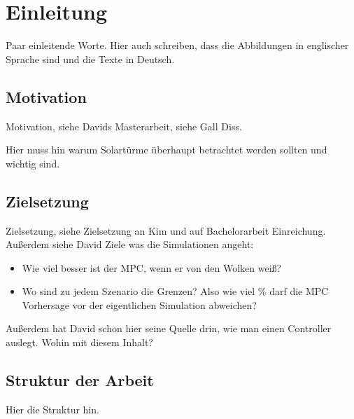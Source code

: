 \chapter{Einleitung} \label{ch_Einleitung}
Paar einleitende Worte.
Hier auch schreiben, dass die Abbildungen in englischer Sprache sind und die Texte in Deutsch.


\section{Motivation} \label{sec_Motivation}
Motivation, siehe Davids Masterarbeit, siehe Gall Diss.

Hier muss hin warum Solartürme überhaupt betrachtet werden sollten und wichtig sind.


\section{Zielsetzung} \label{sec_Zielsetzung}
Zielsetzung, siehe Zielsetzung an Kim und auf Bachelorarbeit Einreichung.
Außerdem siehe David Ziele was die Simulationen angeht:
\begin{itemize}
    \item Wie viel besser ist der MPC, wenn er von den Wolken weiß?
    \item Wo sind zu jedem Szenario die Grenzen? Also wie viel \% darf die MPC Vorhersage vor der eigentlichen Simulation abweichen?
\end{itemize}
Außerdem hat David schon hier seine Quelle drin, wie man einen Controller auslegt.
Wohin mit diesem Inhalt?

\section{Struktur der Arbeit} \label{sec_Struktur}
Hier die Struktur hin.

